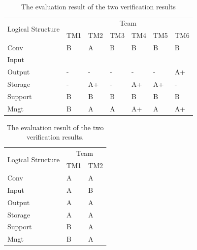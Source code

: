 \documentclass[a4paper,11pt]{jreport}
\begin{document}
\begin{table}[htbp]
  \centering
  \caption{The evaluation result of the two verification results}
    \begin{tabular}{|l|l|l|l|l|l|l|}
    \hline
    \multicolumn{1}{|c|}{\multirow{2}[4]{*}{Logical
Structure}} & \multicolumn{6}{c|}{Team} \bigstrut\\
\cline{2-7}          & TM1   & TM2   & TM3   & TM4   & TM5   & TM6 \bigstrut\\
    \hline
    Conv  & B     & A     & B     & B     & B     & B \bigstrut\\
    \hline
    Input &       &       &       &       &       &  \bigstrut\\
    \hline
    Output & -     & -     & -     & -     & -     & A+ \bigstrut\\
    \hline
    Storage & -     & A+    & -     & A+    & A+    & - \bigstrut\\
    \hline
    Support & B     & B     & B     & B     & B     & B \bigstrut[t]\\
    Mngt  & B     & A     & A     & A+    & A     & A+ \bigstrut[b]\\
    \hline
    \end{tabular}%
  \label{tbl:D-3-tbl5}%
\end{table}%

\begin{table}[htbp]
  \centering
  \caption{The evaluation result of the two verification results.}
    \begin{tabular}{|l|l|l|}
    \hline
    \multicolumn{1}{|c|}{\multirow{2}[4]{*}{Logical
Structure}} & \multicolumn{2}{c|}{Team} \bigstrut\\
\cline{2-3}          & TM1   & TM2 \bigstrut\\
    \hline
    Conv  & A     & A \bigstrut\\
    \hline
    Input & A     & B \bigstrut\\
    \hline
    Output & A     & A \bigstrut\\
    \hline
    Storage & A     & A \bigstrut\\
    \hline
    Support & B     & A \bigstrut\\
    \hline
    Mngt  & B     & A \bigstrut\\
    \hline
    \end{tabular}%
  \label{tbl:D-3-tbl6}%
\end{table}%
\end{document}
